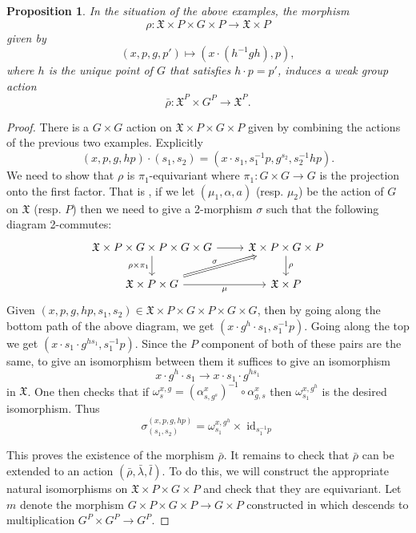 \documentclass[12pt, final]{amsart}
\theoremstyle{remark}
\theoremstyle{definition}
\theoremstyle{plain}
\newtheorem{proposition}[example]{Proposition}
\newcommand{\fX}{{\mathfrak X}}
\DeclareMathOperator{\id}{id}
\begin{document}
\begin{proposition}\label{p:innerAction}
    In the situation of the above examples,
    the morphism 
    $$
    \rho :  \fX\times P \times  G\times P\to \fX\times P
    $$
    given by 
    $$
    (x,p,g,p')\mapsto (x\cdot (h^{-1}gh),p), 
    $$ where $h$ is the unique point of $G$ that satisfies $h\cdot p = p'$,
    induces a weak group action 
    $$
    \bar{\rho}: \fX^{P}\times G^{P}\to \fX^{P}.
    $$
\end{proposition}


\begin{proof}
    There is a $G\times G$ action on $\fX\times P \times  G\times P$ given by combining the actions of the previous two examples. Explicitly
    $$
    (x,p, g, hp)\cdot (s_{1},s_{2}) = (x\cdot s_{1}, s_{1}^{-1}p,g^{s_{2}}, s_{2}^{-1}hp). 
    $$
    We need to show that $\rho$ is $\pi_1$-equivariant where $\pi_1:G\times G\to G$ is the 
    projection onto the first factor. That is , if we let $(\mu_{1},\alpha,a)$ 
    (resp. $\mu_{2}$) be the action of $G$ on $\fX$ (resp. $P$) then we need to give a 
    2-morphism $\sigma$ such that the following diagram 2-commutes:
    $$
    \begin{tikzcd}
        {\fX\times P\times G \times P \times G \times G} & {\fX\times P \times G \times P} \\
        {\fX\times P \times G} & {\fX\times P}
        \arrow[from=1-1, to=1-2]
        \arrow["{\rho\times\pi_1}"', from=1-1, to=2-1]
        \arrow["\rho", from=1-2, to=2-2]
        \arrow["\sigma", Rightarrow, from=2-1, to=1-2]
        \arrow["\mu"', from=2-1, to=2-2]
    \end{tikzcd}
    $$
    Given $(x,p,g,hp,s_1,s_2) \in \fX\times P \times G \times P \times G \times G$,
    then by going along the bottom path of the above diagram, we get 
    $(x\cdot g^{h} \cdot s_{1},s_{1}^{-1}p)$. Going along the top we get
    $(x\cdot s_{1}\cdot g^{hs_1}, s_{1}^{-1}p)$. Since the $P$ component of
    both of these pairs are the same, to give an isomorphism between them it suffices 
    to give an isomorphism 
    $$x\cdot g^{h}\cdot s_{1} \to x\cdot s_{1}\cdot g^{hs_1}$$
    in $\fX$. One then checks that if 
    $\omega_{s}^{x,g} = (\alpha_{s,g^{s}}^{x})^{-1} \circ \alpha_{g,s}^{x}$
    then $\omega_{s_{1}}^{x,g^{h}}$ is the desired isomorphism. Thus 
    $$\sigma_{(s_1,s_2)}^{(x,p,g,hp)} = \omega_{s_{1}}^{x,g^{h}} \times \id_{s_{1}^{-1}p}$$
    
    This proves the existence of the morphism $\bar{\rho}$. It remains to check that 
    $\bar{\rho}$ can be extended to an action $(\bar{\rho}, \bar{\lambda}, \bar{l})$. 
    To do this, we will construct the appropriate natural isomorphisms on 
    $\fX \times P \times G\times P$ and check that they are equivariant. Let $m$
    denote the morphism $G \times P \times G \times P \to G \times P$
    constructed in  which descends to multiplication 
    $G^{P} \times G^{P} \to G^{P}$.


\end{proof}
\end{document}
